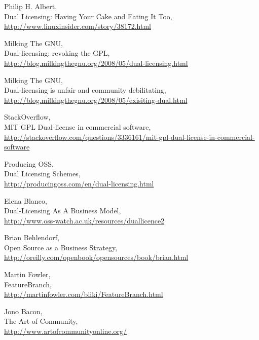 \documentclass[11pt]{scrartcl}
\begin{document}
\begin{thebibliography}{9}

    Philip H. Albert,\\
    Dual Licensing: Having Your Cake and Eating It Too,\\
    \url{http://www.linuxinsider.com/story/38172.html}

    Milking The GNU,\\
    Dual-licensing: revoking the GPL,\\
    \url{http://blog.milkingthegnu.org/2008/05/dual-licensing.html}

    Milking The GNU,\\
    Dual-licensing is unfair and community debilitating,\\
    \url{http://blog.milkingthegnu.org/2008/05/exisiting-dual.html}

    StackOverflow,\\
    MIT GPL Dual-license in commercial software,\\
    \url{http://stackoverflow.com/questions/3336161/mit-gpl-dual-license-in-commercial-software}

    Producing OSS,\\
    Dual Licensing Schemes,\\
    \url{http://producingoss.com/en/dual-licensing.html}

    Elena Blanco,\\
    Dual-Licensing As A Business Model,\\
    \url{http://www.oss-watch.ac.uk/resources/duallicence2}

    Brian Behlendorf,\\
    Open Source as a Business Strategy,\\
    \url{http://oreilly.com/openbook/opensources/book/brian.html}
    
    Martin Fowler,\\
    FeatureBranch,\\
    \url{http://martinfowler.com/bliki/FeatureBranch.html}
    
    Jono Bacon,\\
    The Art of Community,\\
    \url{http://www.artofcommunityonline.org/}
    

\end{thebibliography}
\end{document}
